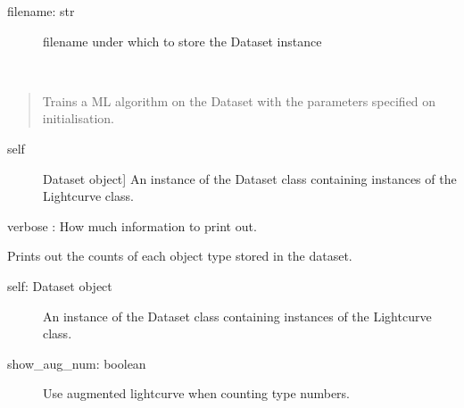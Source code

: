 \documentclass[a4paper,10pt,english]{sphinxmanual}
\begin{document}
\begin{fulllineitems}
\begin{fulllineitems}
\begin{description}
\item[{filename: str}] \leavevmode
filename under which to store the Dataset instance

\end{description}

\end{fulllineitems}


\begin{fulllineitems}
\label{\detokenize{api:malt.Dataset.train}}~\begin{quote}

Trains a ML algorithm on the Dataset with the parameters specified on
initialisation.
\end{quote}
\begin{description}
\item[{self}] \leavevmode{[}Dataset object{]}
An instance of the Dataset class containing instances of the
Lightcurve class.

\end{description}

verbose : How much information to print out.

\end{fulllineitems}


\begin{fulllineitems}
\label{\detokenize{api:malt.Dataset.types}}
Prints out the counts of each object type stored in the dataset.
\begin{description}
\item[{self: Dataset object}] \leavevmode
An instance of the Dataset class containing instances of the
Lightcurve class.

\item[{show\_aug\_num: boolean}] \leavevmode
Use augmented lightcurve when counting type numbers.

\end{description}

\end{fulllineitems}


\end{fulllineitems}
\end{document}
